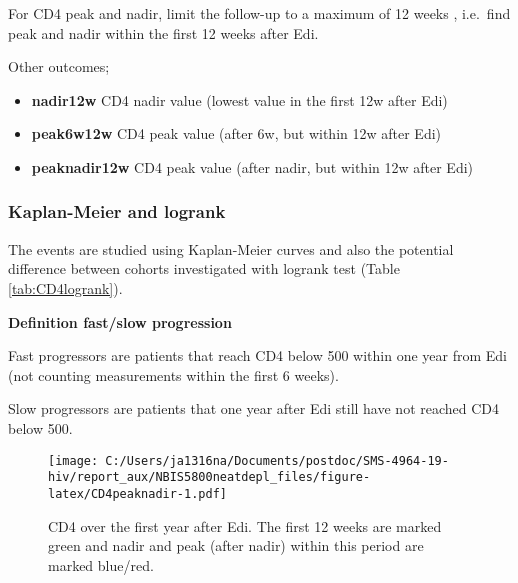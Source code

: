 \documentclass[
]{article}
\providecommand{\tightlist}{%
  \setlength{\itemsep}{0pt}\setlength{\parskip}{0pt}}
\begin{document}
For CD4 peak and nadir, limit the follow-up to a maximum of 12 weeks , i.e.~find peak and nadir within the first 12 weeks after Edi.

Other outcomes;

\begin{itemize}
\tightlist
\item
  \textbf{nadir12w} CD4 nadir value (lowest value in the first 12w after Edi)
\item
  \textbf{peak6w12w} CD4 peak value (after 6w, but within 12w after Edi)
\item
  \textbf{peaknadir12w} CD4 peak value (after nadir, but within 12w after Edi)
\end{itemize}

\FloatBarrier

\hypertarget{kaplan-meier-and-logrank}{%
\subsubsection{Kaplan-Meier and logrank}\label{kaplan-meier-and-logrank}}

The events are studied using Kaplan-Meier curves and also the potential difference between cohorts investigated with logrank test (Table \ref{tab:CD4logrank}).

\textbf{Definition fast/slow progression}

Fast progressors are patients that reach CD4 below 500 within one year from Edi (not counting measurements within the first 6 weeks).

Slow progressors are patients that one year after Edi still have not reached CD4 below 500.

\begin{figure}
\centering
\texttt{[image: C:/Users/ja1316na/Documents/postdoc/SMS-4964-19-hiv/report\_aux/NBIS5800neatdepl\_files/figure-latex/CD4peaknadir-1.pdf]}
\caption{\label{fig:CD4peaknadir}CD4 over the first year after Edi. The first 12 weeks are marked green and nadir and peak (after nadir) within this period are marked blue/red.}
\end{figure}
\end{document}
